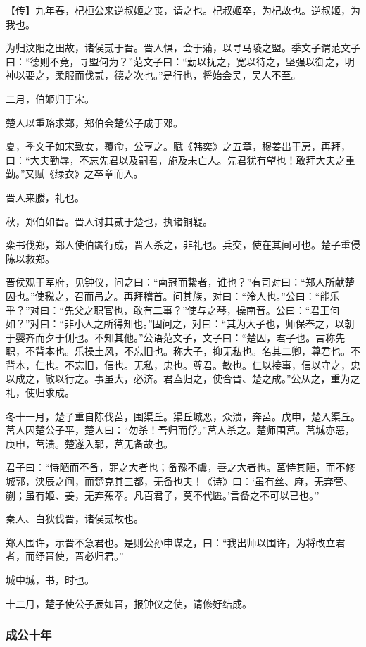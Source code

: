 \documentclass[]{article}
\begin{document}
【传】九年春，杞桓公来逆叔姬之丧，请之也。杞叔姬卒，为杞故也。逆叔姬，为我也。

为归汶阳之田故，诸侯贰于晋。晋人惧，会于蒲，以寻马陵之盟。季文子谓范文子曰：``德则不竞，寻盟何为？''范文子曰：``勤以抚之，宽以待之，坚强以御之，明神以要之，柔服而伐贰，德之次也。''是行也，将始会吴，吴人不至。

二月，伯姬归于宋。

楚人以重赂求郑，郑伯会楚公子成于邓。

夏，季文子如宋致女，覆命，公享之。赋《韩奕》之五章，穆姜出于房，再拜，曰：``大夫勤辱，不忘先君以及嗣君，施及未亡人。先君犹有望也！敢拜大夫之重勤。''又赋《绿衣》之卒章而入。

晋人来媵，礼也。

秋，郑伯如晋。晋人讨其贰于楚也，执诸铜鞮。

栾书伐郑，郑人使伯蠲行成，晋人杀之，非礼也。兵交，使在其间可也。楚子重侵陈以救郑。

晋侯观于军府，见钟仪，问之曰：``南冠而絷者，谁也？''有司对曰：``郑人所献楚囚也。''使税之，召而吊之。再拜稽首。问其族，对曰：``泠人也。''公曰：``能乐乎？''对曰：``先父之职官也，敢有二事？''使与之琴，操南音。公曰：``君王何如？''对曰：``非小人之所得知也。''固问之，对曰：``其为大子也，师保奉之，以朝于婴齐而夕于侧也。不知其他。''公语范文子，文子曰：``楚囚，君子也。言称先职，不背本也。乐操土风，不忘旧也。称大子，抑无私也。名其二卿，尊君也。不背本，仁也。不忘旧，信也。无私，忠也。尊君。敏也。仁以接事，信以守之，忠以成之，敏以行之。事虽大，必济。君盍归之，使合晋、楚之成。''公从之，重为之礼，使归求成。

冬十一月，楚子重自陈伐莒，围渠丘。渠丘城恶，众溃，奔莒。戊申，楚入渠丘。莒人囚楚公子平，楚人曰：``勿杀！吾归而俘。''莒人杀之。楚师围莒。莒城亦恶，庚申，莒溃。楚遂入郓，莒无备故也。

君子曰：``恃陋而不备，罪之大者也；备豫不虞，善之大者也。莒恃其陋，而不修城郭，浃辰之间，而楚克其三都，无备也夫！《诗》曰：`虽有丝、麻，无弃菅、蒯；虽有姬、姜，无弃蕉萃。凡百君子，莫不代匮。'言备之不可以已也。''

秦人、白狄伐晋，诸侯贰故也。

郑人围许，示晋不急君也。是则公孙申谋之，曰：``我出师以围许，为将改立君者，而纾晋使，晋必归君。''

城中城，书，时也。

十二月，楚子使公子辰如晋，报钟仪之使，请修好结成。

\hypertarget{header-n1659}{%
\subsubsection{成公十年}\label{header-n1659}}
\end{document}
